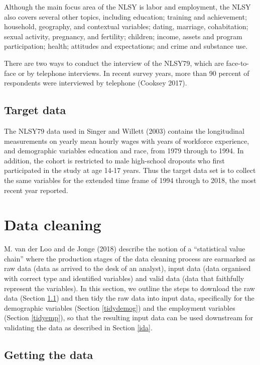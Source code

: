 \documentclass{article}
\begin{document}
Although the main focus area of the NLSY is labor and employment, the NLSY also covers several other topics, including education; training and achievement; household, geography, and contextual variables; dating, marriage, cohabitation; sexual activity, pregnancy, and fertility; children; income, assets and program participation; health; attitudes and expectations; and crime and substance use.

There are two ways to conduct the interview of the NLSY79, which are face-to-face or by telephone interviews. In recent survey years, more than 90 percent of respondents were interviewed by telephone (Cooksey 2017).

\hypertarget{target}{%
\subsection{Target data}\label{target}}

The NLSY79 data used in Singer and Willett (2003) contains the longitudinal measurements on yearly mean hourly wages with years of workforce experience, and demographic variables education and race, from 1979 through to 1994. In addition, the cohort is restricted to male high-school dropouts who first participated in the study at age 14-17 years.
Thus the target data set is to collect the same variables for the extended time frame of 1994 through to 2018, the most recent year reported.

\hypertarget{cleaning}{%
\section{Data cleaning}\label{cleaning}}

M. van der Loo and de Jonge (2018) describe the notion of a ``statistical value chain'' where the production stages of the data cleaning process are earmarked as raw data (data as arrived to the desk of an analyst), input data (data organised with correct type and identified variables) and valid data (data that faithfully represent the variables). In this section, we outline the steps to download the raw data (Section \ref{getdata}) and then tidy the raw data into input data, specifically for the demographic variables (Section \ref{tidydemog}) and the employment variables (Section \ref{tidyemp}), so that the resulting input data can be used downstream for validating the data as described in Section \ref{ida}.

\hypertarget{getdata}{%
\subsection{Getting the data}\label{getdata}}
\end{document}
